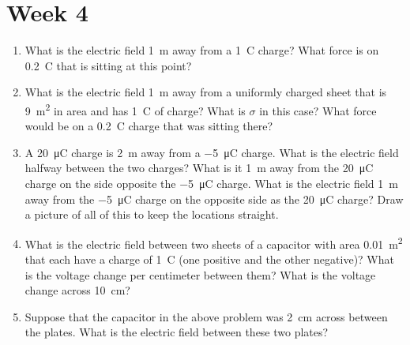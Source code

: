 \vspace{2in}

\section*{Week 4}
\begin{enumerate}
\setlength\itemsep{2 in}
\setcounter{enumi}{\value{counter}}
\item What is the electric field \SI{1}{m} away from a \SI{1}{\coulomb} charge? What force is on \SI{0.2}{\coulomb} that is sitting at this point?

\item What is the electric field \SI{1}{m} away from a uniformly charged sheet that is \SI{9}{m^2} in area and has \SI{1}{\coulomb} of charge? What is $\sigma$ in this case? What force would be on a \SI{0.2}{\coulomb} charge that was sitting there?

\item
A \SI{+20}{\micro\coulomb} charge is \SI{2}{\meter} away from a \SI{-5}{\micro\coulomb} charge. What is the electric field halfway between the two charges? What is it \SI{1}{\meter} away from the \SI{+20}{\micro\coulomb} charge on the side opposite the \SI{-5}{\micro\coulomb} charge. What is the electric field \SI{1}{\meter} away from the \SI{-5}{\micro\coulomb} charge on the opposite side as the \SI{+20}{\micro\coulomb} charge? Draw a picture of all of this to keep the locations straight. \giantskip

\item
What is the electric field between two sheets of a capacitor with area \SI{0.01}{m^2} that each have a charge of \SI{1}{\coulomb} (one positive and the other negative)? What is the voltage change per centimeter between them? What is the voltage change across \SI{10}{cm}? 

\item 
Suppose that the capacitor in the above problem was \SI{2}{cm} across between the plates. What is the electric field between these two plates?
	
\setcounter{counter}{\value{enumi}}
\end{enumerate}



\vspace{2in}

